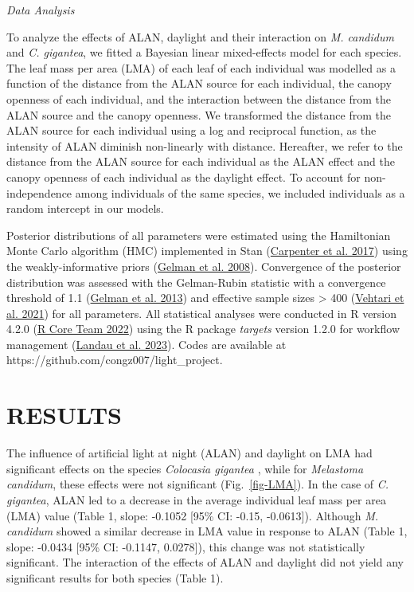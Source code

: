 \documentclass[
  12pt,
  letterpaper,
  DIV=11,
  numbers=noendperiod]{scrartcl}
\begin{document}
\emph{Data Analysis}

To analyze the effects of ALAN, daylight and their interaction on
\emph{M. candidum} and \emph{C. gigantea}, we fitted a Bayesian linear
mixed-effects model for each species. The leaf mass per area (LMA) of
each leaf of each individual was modelled as a function of the distance
from the ALAN source for each individual, the canopy openness of each
individual, and the interaction between the distance from the ALAN
source and the canopy openness. We transformed the distance from the
ALAN source for each individual using a log and reciprocal function, as
the intensity of ALAN diminish non-linearly with distance. Hereafter, we
refer to the distance from the ALAN source for each individual as the
ALAN effect and the canopy openness of each individual as the daylight
effect. To account for non-independence among individuals of the same
species, we included individuals as a random intercept in our models.

Posterior distributions of all parameters were estimated using the
Hamiltonian Monte Carlo algorithm (HMC) implemented in Stan
(\protect\hyperlink{ref-Carpenter2017}{Carpenter et al. 2017}) using the
weakly-informative priors (\protect\hyperlink{ref-Gelman2008}{Gelman et
al. 2008}). Convergence of the posterior distribution was assessed with
the Gelman-Rubin statistic with a convergence threshold of 1.1
(\protect\hyperlink{ref-Gelman2013}{Gelman et al. 2013}) and effective
sample sizes \textgreater{} 400
(\protect\hyperlink{ref-Vehtari2021}{Vehtari et al. 2021}) for all
parameters. All statistical analyses were conducted in R version 4.2.0
(\protect\hyperlink{ref-RCoreTeam2022}{R Core Team 2022}) using the R
package \emph{targets} version 1.2.0 for workflow management
(\protect\hyperlink{ref-Landau2023}{Landau et al. 2023}). Codes are
available at https://github.com/congz007/light\_project.

\hypertarget{results}{%
\section{RESULTS}\label{results}}

The influence of artificial light at night (ALAN) and daylight on LMA
had significant effects on the species \emph{Colocasia gigantea }, while
for \emph{Melastoma candidum}, these effects were not significant
(Fig.~\ref{fig-LMA}). In the case of \emph{C. gigantea}, ALAN led to a
decrease in the average individual leaf mass per area (LMA) value (Table
1, slope: -0.1052 {[}95\% CI: -0.15, -0.0613{]}). Although \emph{M.
candidum} showed a similar decrease in LMA value in response to ALAN
(Table 1, slope: -0.0434 {[}95\% CI: -0.1147, 0.0278{]}), this change
was not statistically significant. The interaction of the effects of
ALAN and daylight did not yield any significant results for both species
(Table 1).
\end{document}
